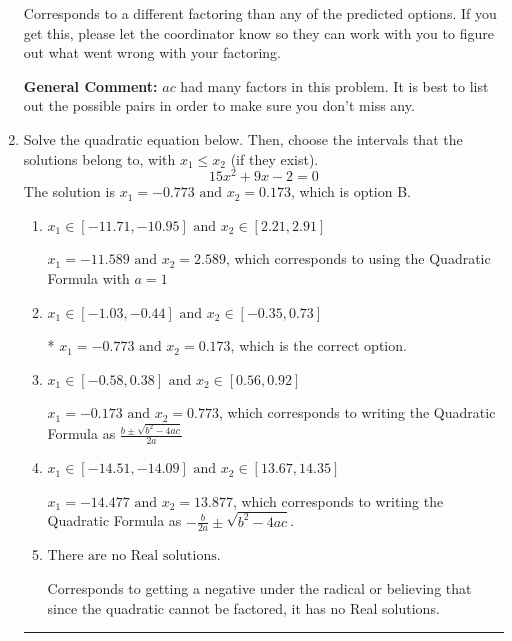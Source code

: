 \documentclass{extbook}[14pt]
\newcommand{\litem}[1]{\item #1

\rule{\textwidth}{0.4pt}}
\begin{document}
\begin{enumerate}
{\begin{enumerate}[label=\Alph*.]
 Corresponds to a different factoring than any of the predicted options. If you get this, please let the coordinator know so they can work with you to figure out what went wrong with your factoring.
\end{enumerate}

\textbf{General Comment:} $ac$ had many factors in this problem. It is best to list out the possible pairs in order to make sure you don't miss any.
}
\litem{
Solve the quadratic equation below. Then, choose the intervals that the solutions belong to, with $x_1 \leq x_2$ (if they exist).
\[ 15x^{2} +9 x -2 = 0 \]The solution is \( x_1 = -0.773 \text{ and } x_2 = 0.173 \), which is option B.\begin{enumerate}[label=\Alph*.]
\item \( x_1 \in [-11.71, -10.95] \text{ and } x_2 \in [2.21, 2.91] \)

 $x_1 = -11.589 \text{ and } x_2 = 2.589$, which corresponds to using the Quadratic Formula with $a=1$
\item \( x_1 \in [-1.03, -0.44] \text{ and } x_2 \in [-0.35, 0.73] \)

* $x_1 = -0.773 \text{ and } x_2 = 0.173$, which is the correct option.
\item \( x_1 \in [-0.58, 0.38] \text{ and } x_2 \in [0.56, 0.92] \)

 $x_1 = -0.173 \text{ and } x_2 = 0.773$, which corresponds to writing the Quadratic Formula as $\frac{b \pm \sqrt{b^2 - 4ac}}{2a}$
\item \( x_1 \in [-14.51, -14.09] \text{ and } x_2 \in [13.67, 14.35] \)

 $x_1 = -14.477 \text{ and } x_2 = 13.877$, which corresponds to writing the Quadratic Formula as $-\frac{b}{2a} \pm \sqrt{b^2 - 4ac}$.
\item \( \text{There are no Real solutions.} \)

Corresponds to getting a negative under the radical or believing that since the quadratic cannot be factored, it has no Real solutions.
\end{enumerate}

}
\end{enumerate}
\end{document}
